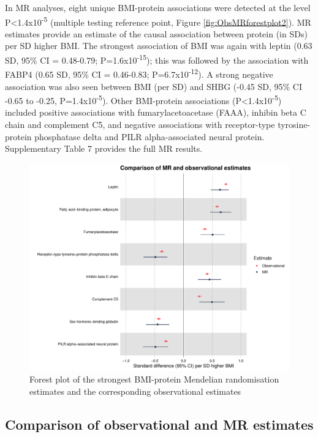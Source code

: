\documentclass[11pt,twoside]{bristolthesis}
\begin{document}
In MR analyses, eight unique BMI-protein associations were detected at the level P\textless1.4x10\textsuperscript{-5} (multiple testing reference point, Figure \ref{fig:ObsMRforestplot2}). MR estimates provide an estimate of the causal association between protein (in SDs) per SD higher BMI. The strongest association of BMI was again with leptin (0.63 SD, 95\% CI = 0.48-0.79; P=1.6x10\textsuperscript{-15}); this was followed by the association with FABP4 (0.65 SD, 95\% CI = 0.46-0.83; P=6.7x10\textsuperscript{-12}). A strong negative association was also seen between BMI (per SD) and SHBG (-0.45 SD, 95\% CI -0.65 to -0.25, P=1.4x10\textsuperscript{-5}). Other BMI-protein associations (P\textless1.4x10\textsuperscript{-5}) included positive associations with fumarylacetoacetase (FAAA), inhibin beta C chain and complement C5, and negative associations with receptor-type tyrosine-protein phosphatase delta and PILR alpha-associated neural protein. Supplementary Table 7 provides the full MR results.
\begin{figure}
\includegraphics[width=1\linewidth,height=0.6\textheight]{figure/BMI_protein_INTERVAL/MR_obs_compar_forestplot} \caption{Forest plot of the strongest BMI-protein Mendelian randomisation estimates and the corresponding observational estimates}\label{fig:ObsMRforesplot2}
\end{figure}
\hypertarget{comparison-of-observational-and-mr-estimates}{%
\subsection{Comparison of observational and MR estimates}\label{comparison-of-observational-and-mr-estimates}}
\end{document}
